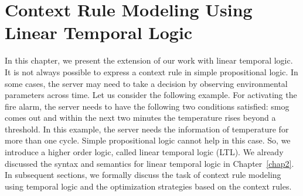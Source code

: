 \chapter{Context Rule Modeling Using Linear Temporal Logic} \label{chap6}
\noindent
In this chapter, we present the extension of our work with linear temporal logic.
It is not always possible to express a context rule in simple propositional logic.
In some cases, the server may need to take a decision by observing environmental parameters across time.
Let us consider the following example.
For activating the fire alarm, the server needs to have the following two conditions satisfied:
smog comes out and within the next two minutes the temperature rises beyond a threshold.
In this example, the server needs the information of temperature for more than one cycle.
Simple propositional logic cannot help in this case. So, we introduce a higher order logic,
called linear temporal logic (LTL). We already discussed the syntax and semantics for linear temporal logic 
in Chapter~\ref{chap2}. 
In subsequent sections, we formally discuss the task of context rule modeling using temporal logic and 
the optimization strategies based on the context rules.


